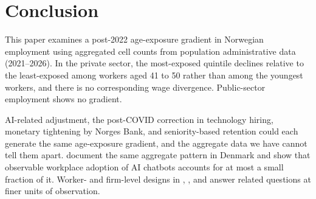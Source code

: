 \section{Conclusion}
\label{sec:conclusion}

This paper examines a post-2022 age-exposure gradient in Norwegian employment using aggregated cell counts from population administrative data (2021--2026). In the private sector, the most-exposed quintile declines relative to the least-exposed among workers aged 41 to 50 rather than among the youngest workers, and there is no corresponding wage divergence. Public-sector employment shows no gradient.

AI-related adjustment, the post-COVID correction in technology hiring, monetary tightening by Norges Bank, and seniority-based retention could each generate the same age-exposure gradient, and the aggregate data we have cannot tell them apart. \citet{humlum2026} document the same aggregate pattern in Denmark and show that observable workplace adoption of AI chatbots accounts for at most a small fraction of it. Worker- and firm-level designs in \citet{brynjolfsson2025}, \citet{lodefalk2026}, and \citet{humlum2026} answer related questions at finer units of observation.
